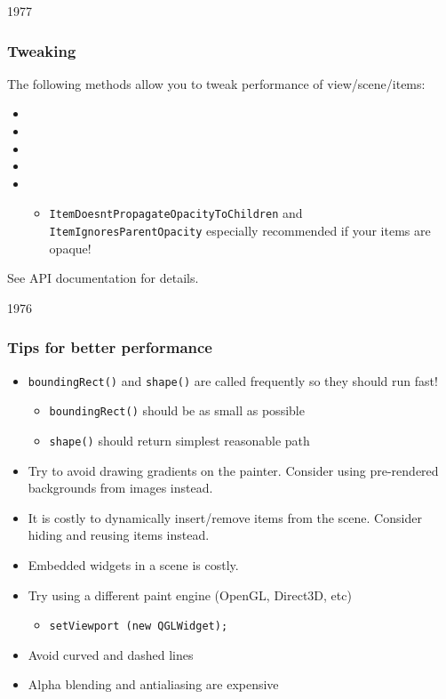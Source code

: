 \begin{slide}{1977}

\frametitle{Tweaking}
The following methods allow you to tweak performance of view/scene/items:
\begin{itemize}
\item {}

\item {}

\item {}

\item {}

\item {}

    \begin{itemize}
    \item \texttt{ItemDoesntPropagateOpacityToChildren} and \texttt{ItemIgnoresParentOpacity} especially recommended if your items are opaque! 
    \end{itemize}
\end{itemize}
See API documentation for details. 
\end{slide}



\begin{slide}{1976}

\frametitle{Tips for better performance}
\begin{itemize}
   \item \texttt{boundingRect()} and \texttt{shape()} are called frequently so they should run fast!
        \begin{itemize}
            \item \texttt{boundingRect()} should be as small as possible
            \item \texttt{shape()} should return simplest reasonable path
        \end{itemize}
   \item Try to avoid drawing gradients on the painter. Consider using pre-rendered backgrounds from images instead.
   \item It is costly to dynamically insert/remove items from the scene.  Consider hiding and reusing items instead. 
   \item Embedded widgets in a scene is costly.
   \item Try using a different paint engine (OpenGL, Direct3D, etc)
        \begin{itemize}
        \item \texttt{setViewport (new QGLWidget);}
        \end{itemize}
   \item Avoid curved and dashed lines
   \item Alpha blending and antialiasing are expensive

   
\end{itemize} 
\end{slide}

   
  
